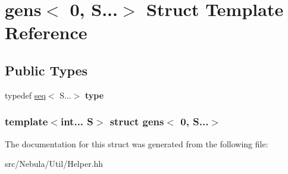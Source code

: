 \hypertarget{structgens_3_010_00_01S_8_8_8_4}{\section{gens$<$ 0, \-S...$>$ \-Struct \-Template \-Reference}
\label{structgens_3_010_00_01S_8_8_8_4}
}
\subsection*{\-Public \-Types}
\begin{DoxyCompactItemize}
\item 
\hypertarget{structgens_3_010_00_01S_8_8_8_4_a3c50f0313d7187280e401848eef1bb29}{typedef \hyperlink{structseq}{seq}$<$ \-S...$>$ {\bfseries type}}\label{structgens_3_010_00_01S_8_8_8_4_a3c50f0313d7187280e401848eef1bb29}

\end{DoxyCompactItemize}
\subsubsection*{template$<$int... \-S$>$ struct gens$<$ 0, S...$>$}



\-The documentation for this struct was generated from the following file\-:\begin{DoxyCompactItemize}
\item 
src/\-Nebula/\-Util/\-Helper.\-hh\end{DoxyCompactItemize}
